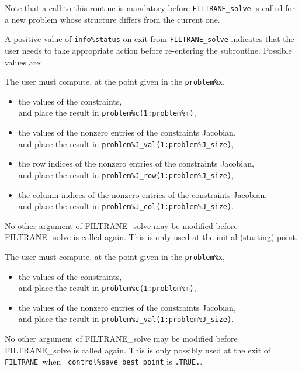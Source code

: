 \documentclass{galahad}
\newcommand{\packagename}{FILTRANE}
\newcommand{\filtrane}{{\tt \packagename}}
\begin{document}
\noindent
Note that a call to this routine is mandatory before {\tt \packagename\_solve}
is called for a new problem whose structure differs from the current
one.
 

\galreverse

A positive value of {\tt info\%status} on exit from  
{\tt \packagename\_solve} indicates that the user needs to take appropriate 
action before re-entering the subroutine. Possible values are: 
 
\begin{description} 
 
 The user must compute, at the point given in the {\tt problem\%x},
\begin{itemize}
\item the values of the constraints, \\ 
      and place the result in {\tt problem\%c(1:problem\%m)},
\item the values of the nonzero entries of the constraints Jacobian, \\
      and place the result in {\tt problem\%J\_val(1:problem\%J\_size)},
\item the row indices of the nonzero entries of the constraints Jacobian, \\
      and place the result in {\tt problem\%J\_row(1:problem\%J\_size)},
\item the column indices of the nonzero entries of the constraints Jacobian,\\
      and place the result in {\tt problem\%J\_col(1:problem\%J\_size)}.
\end{itemize}
No other argument of \packagename\_solve may be modified 
before \packagename\_solve is called again.
This is only used at the initial (starting) point.
 
 The user must compute, at the point given in the {\tt problem\%x},
\begin{itemize}
\item the values of the constraints, \\ 
      and place the result in {\tt problem\%c(1:problem\%m)},
\item the values of the nonzero entries of the constraints Jacobian, \\
      and place the result in {\tt problem\%J\_val(1:problem\%J\_size)}.
\end{itemize}
No other argument of \packagename\_solve may be modified 
before \packagename\_solve is called again.
This is only possibly used at the exit of \filtrane\ when {\tt
control\%save\_best\_point} is {\tt .TRUE.}.



\end{description}
\end{document}
